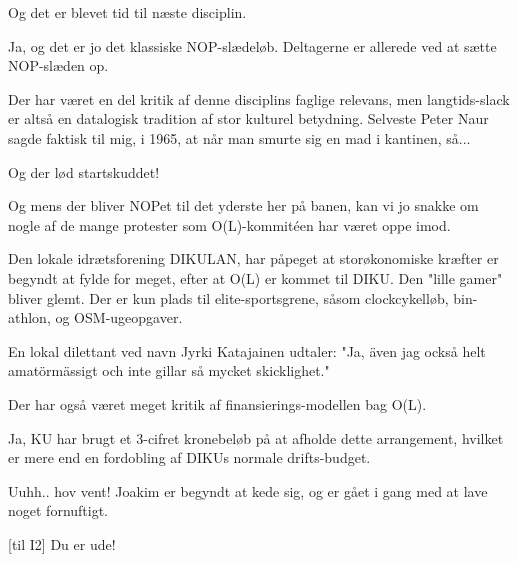 \documentclass[a4paper,11pt]{article}
\begin{document}
\begin{sketch}

   Og det er blevet tid til næste disciplin.


   Ja, og det er jo det klassiske NOP-slædeløb.  Deltagerne
  er allerede ved at sætte NOP-slæden op.


   Der har været en del kritik af denne disciplins faglige
  relevans, men langtids-slack er altså en datalogisk tradition af
  stor kulturel betydning.  Selveste Peter Naur sagde faktisk til mig,
  i 1965, at når man smurte sig en mad i kantinen, så...


   Og der lød startskuddet!


   Og mens der bliver NOPet til det yderste her på banen, kan vi jo
  snakke om nogle af de mange protester som O(L)-kommitéen har været
  oppe imod.

   Den lokale idrætsforening DIKULAN, har påpeget at
  storøkonomiske kræfter er begyndt at fylde for meget, efter at O(L)
  er kommet til DIKU. Den "lille gamer" bliver glemt. Der er kun plads
  til elite-sportsgrene, såsom clockcykelløb, bin-athlon, og
  OSM-ugeopgaver.

   En lokal dilettant ved navn Jyrki Katajainen udtaler: "Ja, även
  jag också helt amatörmässigt och inte gillar så mycket skicklighet."


   Der har også været meget kritik af finansierings-modellen bag O(L).

   Ja, KU har brugt et 3-cifret kronebeløb på at afholde dette
  arrangement, hvilket er mere end en fordobling af DIKUs normale
  drifts-budget.


   Uuhh.. hov vent! Joakim er begyndt at kede sig, og er gået
  i gang med at lave noget fornuftigt.

  [til I2] Du er ude!


\end{sketch}
\end{document}
